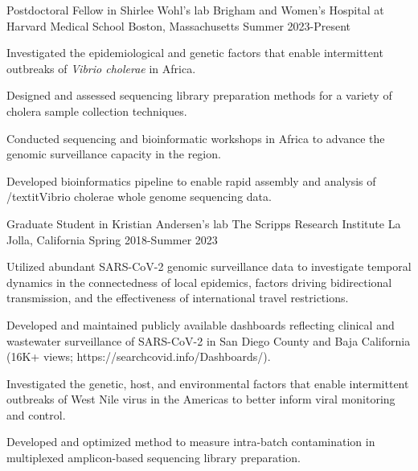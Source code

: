 
\begin{cventries}

  \cventry
    {Postdoctoral Fellow in Shirlee Wohl's lab} %
    {Brigham and Women's Hospital at Harvard Medical School} %
    {Boston, Massachusetts} %
    {Summer 2023-Present} %
    {
      \begin{cvitems} %
      \item {Investigated the epidemiological and genetic factors that enable intermittent outbreaks of \textit{Vibrio cholerae} in Africa.}
        \item {Designed and assessed sequencing library preparation methods for a variety of cholera sample collection techniques.}
        \item {Conducted sequencing and bioinformatic workshops in Africa to advance the genomic surveillance capacity in the region.}
        \item {Developed bioinformatics pipeline to enable rapid assembly and analysis of /textit{Vibrio cholerae} whole genome sequencing data.}
      \end{cvitems}
    }

  \cventry
    {Graduate Student in Kristian Andersen's lab} %
    {The Scripps Research Institute} %
    {La Jolla, California} %
    {Spring 2018-Summer 2023} %
    {
      \begin{cvitems} %
        \item {Utilized abundant SARS-CoV-2 genomic surveillance data to investigate temporal dynamics in the connectedness of local epidemics, factors driving bidirectional transmission, and the effectiveness of international travel restrictions.}
        \item {Developed and maintained publicly available dashboards reflecting clinical and wastewater surveillance of SARS-CoV-2 in San Diego County and Baja California (16K+ views; https://searchcovid.info/Dashboards/).}
        \item {Investigated the genetic, host, and environmental factors that enable intermittent outbreaks of West Nile virus in the Americas to better inform viral monitoring and control.}
        \item {Developed and optimized method to measure intra-batch contamination in multiplexed amplicon-based sequencing library preparation.}
      \end{cvitems}
    }


\end{cventries}
